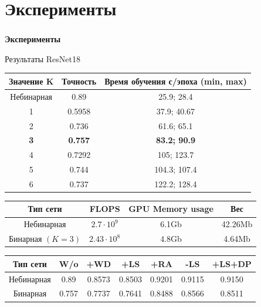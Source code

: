 \documentclass[usenames,dvipsnames, 10pt]{beamer}
\begin{document}
\section{Эксперименты}
\begin{frame}
\frametitle{\phatom}
\centering
\Large \textbf{Эксперименты}
\end{frame}
\begin{frame}{Результаты ResNet18}
    \vskip -0.4cm
    \centering
    \begin{tabular}{|c|c|c|}
        \hline
        Значение K & Точность & Время обучения с/эпоха (min, max) \\
        \hline
        Небинарная & 0.89 & 25.9; 28.4 \\
        1 & 0.5958 & 37.9; 40.67 \\
        2 & 0.736 & 61.6; 65.1\\
        \textbf{3} & \textbf{0.757} & \textbf{83.2; 90.9}\\
        4 & 0.7292 & 105; 123.7\\
        5 & 0.744 & 104.3; 107.4\\
        6 & 0.737 & 122.2; 128.4\\
        \hline
    \end{tabular}
    \vskip 0.3cm
    \begin{tabular}{|c|c|c|c|}
        \hline
        Тип сети & FLOPS & GPU Memory usage & Вес  \\
        \hline
        Небинарная & $2.7 \cdot 10^9$ & 6.1Gb & 42.26Mb \\
        Бинарная $(K=3)$ & $2.43 \cdot 10^8$ & 4.8Gb & 4.64Mb \\
        \hline
    \end{tabular}
    \vskip 0.3cm
    \begin{tabular}{|c|c|c|c|c|c|c|}
        \hline
        Тип сети & W/o & +WD & +LS & +RA & -LS & +LS+DP \\
        \hline
        Небинарная & 0.89 & 0.8573 & 0.8503 & 0.9201 & 0.9115 & 0.9150 \\
        Бинарная & 0.757 & 0.7737 & 0.7641 & 0.8488 & 0.8566 & 0.8511\\
        \hline
    \end{tabular}
    
\end{frame}
\end{document}
